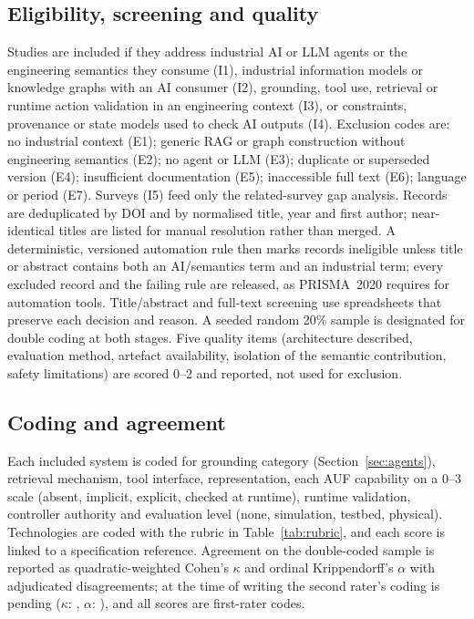 \subsection{Eligibility, screening and quality}
Studies are included if they address industrial AI or LLM agents or the engineering
semantics they consume (I1), industrial information models or knowledge graphs with an AI
consumer (I2), grounding, tool use, retrieval or runtime action validation in an
engineering context (I3), or constraints, provenance or state models used to check AI
outputs (I4). Exclusion codes are: no industrial context (E1); generic RAG or graph
construction without engineering semantics (E2); no agent or LLM (E3); duplicate or
superseded version (E4); insufficient documentation (E5); inaccessible full text (E6);
language or period (E7). Surveys (I5) feed only the related-survey gap analysis. Records are
deduplicated by DOI and by normalised title, year
and first author; near-identical titles are listed for manual resolution rather than
merged. A deterministic, versioned automation rule then marks records ineligible unless
title or abstract contains both an AI/semantics term and an industrial term; every
excluded record and the failing rule are released, as PRISMA~2020 requires for automation
tools. Title/abstract and full-text screening use spreadsheets that preserve each
decision and reason. A seeded random 20\% sample is designated for double coding at both
stages. Five quality items (architecture described, evaluation method, artefact
availability, isolation of the semantic contribution, safety limitations) are scored 0--2
and reported, not used for exclusion.

\subsection{Coding and agreement}
Each included system is coded for grounding category (Section~\ref{sec:agents}), retrieval
mechanism, tool interface, representation, each AUF capability on a 0--3 scale (absent,
implicit, explicit, checked at runtime), runtime validation, controller authority and
evaluation level (none, simulation, testbed, physical). Technologies are coded with the
rubric in Table~\ref{tab:rubric}, and each score is linked to a specification reference.
Agreement on the double-coded sample is reported as quadratic-weighted Cohen's $\kappa$
and ordinal Krippendorff's $\alpha$ with adjudicated disagreements; at the time of writing
the second rater's coding is pending ($\kappa$: \AufKappa{}, $\alpha$: \AufAlpha{}), and all
scores are first-rater codes.

